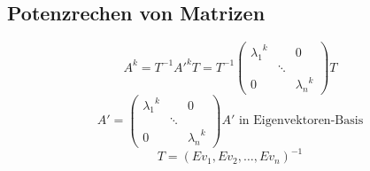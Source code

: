 	\subsection{Potenzrechen von Matrizen}
		\begin{equation*}
			A^k = T^{-1}{A'}^kT = T^{-1}\left(\begin{array}{ccc}
				{\lambda_1}^k & & 0\\
				& \ddots & \\
				0 & & {\lambda_n}^k
			\end{array}\right) T
		\end{equation*}
		\begin{equation*}
			A' = \left(\begin{array}{ccc}
				{\lambda_1}^k & & 0\\
				& \ddots & \\
				0 & & {\lambda_n}^k
			\end{array}\right) 
			A' \text{ in Eigenvektoren-Basis}
		\end{equation*}
		\begin{equation*}
			T = (Ev_1, Ev_2, \ldots, Ev_n)^{-1}
		\end{equation*}

